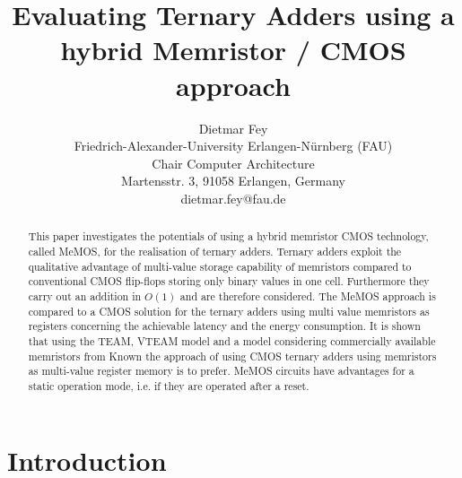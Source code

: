 \documentclass[pageno]{jpaper}
\begin{document}
\title{
Evaluating Ternary Adders using a hybrid Memristor / CMOS approach }

\date{}

\author{Dietmar Fey\\
Friedrich-Alexander-University Erlangen-N{\"u}rnberg (FAU) \\
Chair Computer Architecture \\
Martensstr. 3, 91058 Erlangen, Germany \\
dietmar.fey@fau.de}

\maketitle

\thispagestyle{empty}

\begin{abstract}
\vspace{1.2mm}
This paper investigates the potentials of using a hybrid memristor CMOS technology, called MeMOS, for the realisation of ternary adders. Ternary adders exploit the qualitative advantage of multi-value storage capability of memristors compared to conventional CMOS flip-flops storing only binary values in one cell. Furthermore they carry out an addition in $O(1)$ and are therefore considered. The MeMOS approach is compared to a CMOS solution for the ternary adders using multi value memristors as registers concerning the achievable latency and the energy consumption. It is shown that using the TEAM, VTEAM model and a model considering commercially available memristors from Known the approach of using CMOS ternary adders using memristors as multi-value register memory is to prefer. MeMOS circuits have advantages for a static operation mode, i.e. if they are operated after a reset. 
\end{abstract}

\section{Introduction}

\end{document}
